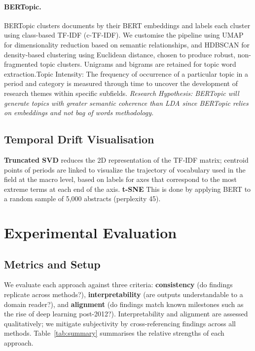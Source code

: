 \documentclass{article}
\begin{document}
\paragraph{BERTopic.}
BERTopic \citep{grootendorst2022bertopic} clusters documents
by their BERT embeddings and labels each cluster using
class-based TF-IDF (c-TF-IDF). We customise the pipeline
using UMAP \citep{mcinnes2018umap} for dimensionality
reduction based on semantic relationships, and HDBSCAN
\citep{campello2013hdbscan} for density-based clustering
using Euclidean distance, chosen to produce robust,
non-fragmented topic clusters. Unigrams and bigrams are
retained for topic word extraction.Topic Intensity: 
The frequency of occurrence of a particular topic in a period and
category is measured through time to uncover the development of 
research themes within specific subfields.
\textit{Research Hypothesis:
BERTopic will generate topics with greater semantic coherence than 
LDA since BERTopic relies on embeddings and not bag of words 
methodology.}

\subsection{Temporal Drift Visualisation}

\textbf{Truncated SVD} \citep{scikit-learn} reduces the 2D representation of the TF-IDF matrix; centroid points of periods are linked to visualize the trajectory of vocabulary used in the field at the macro level, based on
labels for axes that correspond to the most extreme terms at each end of the axis. \textbf{t-SNE} \citep{vandermaaten2008} This is done by applying
BERT to a random sample of 5,000 abstracts (perplexity 45).


\section{Experimental Evaluation}
\label{sec:evaluation}

\subsection{Metrics and Setup}

We evaluate each approach against three criteria:
\textbf{consistency} (do findings replicate across
methods?), \textbf{interpretability} (are outputs
understandable to a domain reader?), and
\textbf{alignment} (do findings match known milestones
such as the rise of deep learning post-2012?).
Interpretability and alignment are assessed qualitatively;
we mitigate subjectivity by cross-referencing findings
across all methods. Table~\ref{tab:summary} summarises
the relative strengths of each approach.
\end{document}

